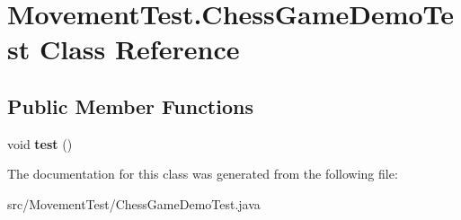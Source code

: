 \hypertarget{class_movement_test_1_1_chess_game_demo_test}{\section{Movement\-Test.\-Chess\-Game\-Demo\-Test Class Reference}
\label{class_movement_test_1_1_chess_game_demo_test}
}
\subsection*{Public Member Functions}
\begin{DoxyCompactItemize}
\item 
\hypertarget{class_movement_test_1_1_chess_game_demo_test_af6f4d48c1dea3eca919c1f1faa0329ab}{void {\bfseries test} ()}\label{class_movement_test_1_1_chess_game_demo_test_af6f4d48c1dea3eca919c1f1faa0329ab}

\end{DoxyCompactItemize}


The documentation for this class was generated from the following file\-:\begin{DoxyCompactItemize}
\item 
src/\-Movement\-Test/Chess\-Game\-Demo\-Test.\-java\end{DoxyCompactItemize}
